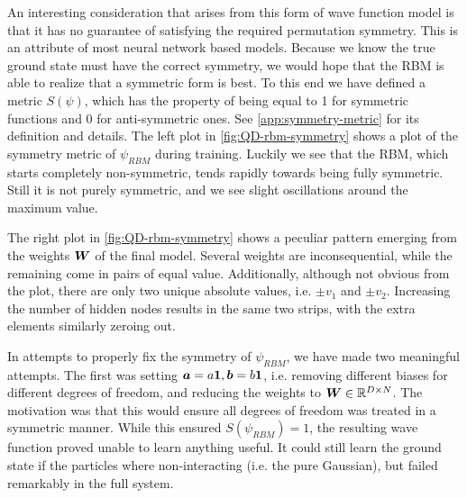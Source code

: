 \documentclass[Thesis.tex]{subfiles}
\begin{document}
%   

%         

An interesting consideration that arises from this form of wave function model
is that it has no guarantee of satisfying the required permutation symmetry.
This is an attribute of most neural network based models. Because we know the
true ground state must have the correct symmetry, we would hope that the RBM is
able to realize that a symmetric form is best. To this end we have defined a
metric $S(\psi)$, which has the property of being equal to 1 for symmetric
functions and $0$ for anti-symmetric ones. See \cref{app:symmetry-metric} for
its definition and details. The left plot in \cref{fig:QD-rbm-symmetry} shows a
plot of the symmetry metric of $\psi_{RBM}$ during training. Luckily we see
that the RBM, which starts completely non-symmetric, tends rapidly towards being
fully symmetric. Still it is not purely symmetric, and we see slight
oscillations around the maximum value.

The right plot in \cref{fig:QD-rbm-symmetry} shows a peculiar pattern emerging
from the weights $\bm{W}$ of the final model. Several weights are
inconsequential, while the remaining come in pairs of equal value. Additionally,
although not obvious from the plot, there are only two unique absolute values,
i.e. $\pm v_1$ and $\pm v_2$. Increasing the number of hidden nodes results in
the same two strips, with the extra elements similarly zeroing out. 

In attempts to properly fix the symmetry of $\psi_{RBM}$, we have made two meaningful
attempts. The first was setting $\bm{a} =a \bm{1}, \bm{b} = b\bm{1}$, i.e. removing
different biases for different degrees of freedom, and reducing the weights to
$\bm{W}\in\mathbb{R}^{D\times N}$. The motivation was that this would ensure all
degrees of freedom was treated in a symmetric manner. While this ensured
$S(\psi_{RBM})=1$, the resulting wave function proved unable to learn anything
useful. It could still learn the ground state if the particles where
non-interacting (i.e. the pure Gaussian), but failed remarkably in the full
system.
\end{document}
